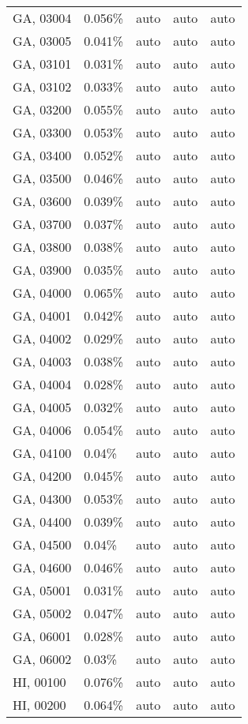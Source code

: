 \begin{longtable}[]{@{}lllll@{}}
GA, 03004 & 0.056\% & auto & auto & auto \\
GA, 03005 & 0.041\% & auto & auto & auto \\
GA, 03101 & 0.031\% & auto & auto & auto \\
GA, 03102 & 0.033\% & auto & auto & auto \\
GA, 03200 & 0.055\% & auto & auto & auto \\
GA, 03300 & 0.053\% & auto & auto & auto \\
GA, 03400 & 0.052\% & auto & auto & auto \\
GA, 03500 & 0.046\% & auto & auto & auto \\
GA, 03600 & 0.039\% & auto & auto & auto \\
GA, 03700 & 0.037\% & auto & auto & auto \\
GA, 03800 & 0.038\% & auto & auto & auto \\
GA, 03900 & 0.035\% & auto & auto & auto \\
GA, 04000 & 0.065\% & auto & auto & auto \\
GA, 04001 & 0.042\% & auto & auto & auto \\
GA, 04002 & 0.029\% & auto & auto & auto \\
GA, 04003 & 0.038\% & auto & auto & auto \\
GA, 04004 & 0.028\% & auto & auto & auto \\
GA, 04005 & 0.032\% & auto & auto & auto \\
GA, 04006 & 0.054\% & auto & auto & auto \\
GA, 04100 & 0.04\% & auto & auto & auto \\
GA, 04200 & 0.045\% & auto & auto & auto \\
GA, 04300 & 0.053\% & auto & auto & auto \\
GA, 04400 & 0.039\% & auto & auto & auto \\
GA, 04500 & 0.04\% & auto & auto & auto \\
GA, 04600 & 0.046\% & auto & auto & auto \\
GA, 05001 & 0.031\% & auto & auto & auto \\
GA, 05002 & 0.047\% & auto & auto & auto \\
GA, 06001 & 0.028\% & auto & auto & auto \\
GA, 06002 & 0.03\% & auto & auto & auto \\
HI, 00100 & 0.076\% & auto & auto & auto \\
HI, 00200 & 0.064\% & auto & auto & auto \\

\end{longtable}
